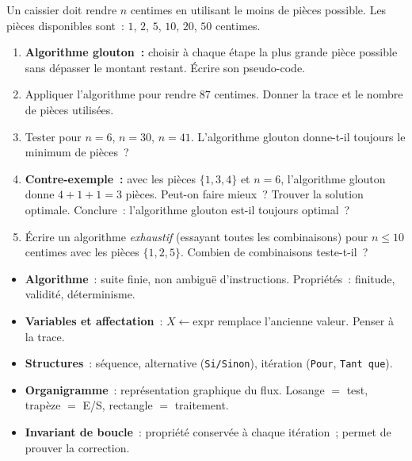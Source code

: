 \begin{challenge}
Un caissier doit rendre $n$ centimes en utilisant le moins de pi\`eces possible.
Les pi\`eces disponibles sont~: $1$, $2$, $5$, $10$, $20$, $50$ centimes.
\begin{enumerate}
  \item \textbf{Algorithme glouton~:} choisir \`a chaque \'etape la plus grande
        pi\`ece possible sans d\'epasser le montant restant.
        \'Ecrire son pseudo-code.
  \item Appliquer l'algorithme pour rendre $87$ centimes.
        Donner la trace et le nombre de pi\`eces utilis\'ees.
  \item Tester pour $n = 6$, $n = 30$, $n = 41$.
        L'algorithme glouton donne-t-il toujours le minimum de pi\`eces~?
  \item \textbf{Contre-exemple~:} avec les pi\`eces $\{1, 3, 4\}$ et $n=6$,
        l'algorithme glouton donne $4+1+1 = 3$ pi\`eces.
        Peut-on faire mieux~? Trouver la solution optimale.
        Conclure~: l'algorithme glouton est-il toujours optimal~?
  \item \'Ecrire un algorithme \emph{exhaustif} (essayant toutes les combinaisons)
        pour $n \leq 10$ centimes avec les pi\`eces $\{1,2,5\}$.
        Combien de combinaisons teste-t-il~?
\end{enumerate}
\end{challenge}

\begin{bilan}
\begin{itemize}
  \item \textbf{Algorithme}~: suite finie, non ambigu\"{e} d'instructions.
        Propri\'et\'es~: finitude, validit\'e, d\'eterminisme.
  \item \textbf{Variables et affectation}~: $X\leftarrow\text{expr}$
        remplace l'ancienne valeur. Penser \`a la trace.
  \item \textbf{Structures}~: s\'equence, alternative (\texttt{Si/Sinon}),
        it\'eration (\texttt{Pour}, \texttt{Tant que}).
  \item \textbf{Organigramme}~: repr\'esentation graphique du flux.
        Losange $=$ test, trap\`eze $=$ E/S, rectangle $=$ traitement.
  \item \textbf{Invariant de boucle}~: propri\'et\'e conserv\'ee \`a chaque
        it\'eration~; permet de prouver la correction.
\end{itemize}
\end{bilan}
